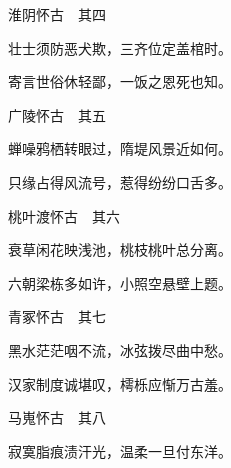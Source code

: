 \begin{poem}
\begin{pl}
        淮阴怀古　其四
    \end{pl}
    \begin{pl}

        壮士须防恶犬欺，三齐位定盖棺时。
    \end{pl}
    \begin{pl}

        寄言世俗休轻鄙，一饭之恩死也知。
    \end{pl}
    \emptypl

    \begin{pl}

        广陵怀古　其五
    \end{pl}
    \begin{pl}

        蝉噪鸦栖转眼过，隋堤风景近如何。
    \end{pl}
    \begin{pl}

        只缘占得风流号，惹得纷纷口舌多。
    \end{pl}
    \emptypl

    \begin{pl}

        桃叶渡怀古　其六
    \end{pl}
    \begin{pl}

        衰草闲花映浅池，桃枝桃叶总分离。
    \end{pl}
    \begin{pl}

        六朝梁栋多如许，小照空悬壁上题。
    \end{pl}
    \emptypl
    \begin{pl}

        青冢怀古　其七
    \end{pl}
    \begin{pl}

        黑水茫茫咽不流，冰弦拨尽曲中愁。
    \end{pl}
    \begin{pl}

        汉家制度诚堪叹，樗栎应惭万古羞。
    \end{pl}
    \emptypl

    \begin{pl}

        马嵬怀古　其八
    \end{pl}
    \begin{pl}

        寂寞脂痕渍汗光，温柔一旦付东洋。
    \end{pl}
    \begin{pl}


\end{pl}
\end{poem}
